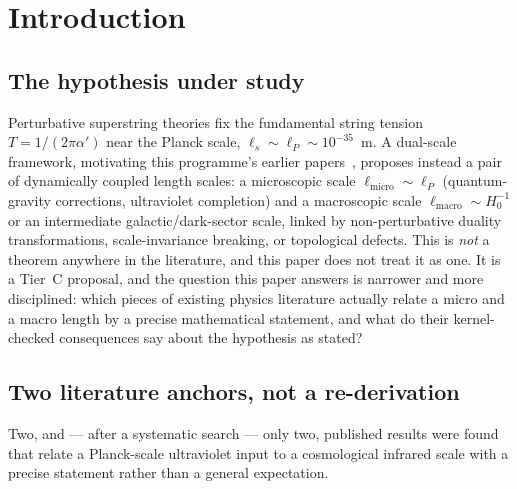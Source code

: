 \documentclass[11pt,a4paper]{article}
\theoremstyle{remark}
\begin{document}
\section{Introduction}
\label{sec:intro}

\subsection{The hypothesis under study}
Perturbative superstring theories fix the fundamental string tension $T=1/(2\pi\alpha')$ near the
Planck scale, $\ell_s\sim\ell_P\sim10^{-35}$~m. A dual-scale framework, motivating this
programme's earlier papers~\cite{Callens2026Paper1,Callens2026Paper7}, proposes instead a pair of
dynamically coupled length scales: a microscopic scale $\ell_{\mathrm{micro}}\sim\ell_P$
(quantum-gravity corrections, ultraviolet completion) and a macroscopic scale
$\ell_{\mathrm{macro}}\sim H_0^{-1}$ or an intermediate galactic/dark-sector scale, linked by
non-perturbative duality transformations, scale-invariance breaking, or topological defects. This
is \emph{not} a theorem anywhere in the literature, and this paper does not treat it as one. It is
a Tier~C proposal, and the question this paper answers is narrower and more disciplined: which
pieces of existing physics literature actually relate a micro and a macro length by a precise
mathematical statement, and what do their kernel-checked consequences say about the hypothesis as
stated?

\subsection{Two literature anchors, not a re-derivation}
Two, and — after a systematic search — only two, published results were found that relate a
Planck-scale ultraviolet input to a cosmological infrared scale with a precise statement rather
than a general expectation.
\end{document}
